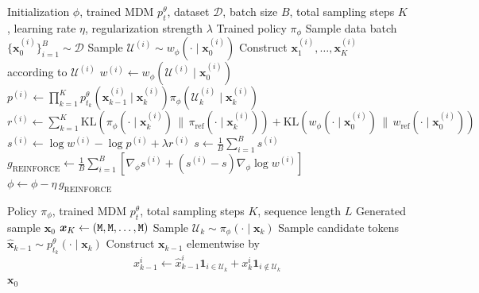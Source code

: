 \begin{algorithm}[tb]
  \caption{\alg{} Training}
  \label{alg:train}
  \begin{algorithmic}[1]
    \Input Initialization $\phi$, trained MDM $p^\theta_t$, dataset $\mathcal D$, batch size $B$, total sampling steps $K$, learning rate $\eta$, regularization strength $\lambda$
    \Output Trained policy $\pi_\phi$
    \Repeat
      \State Sample data batch $\{\bm x_0^{(i)}\}_{i=1}^B \sim \mathcal D$
        \State Sample $\mathcal U^{(i)} \sim w_\phi(\cdot \mid \bm x_0^{(i)})$
        \State Construct $\bm x_1^{(i)},\ldots,\bm x_K^{(i)}$ according to $\mathcal U^{(i)}$
        \State $w^{(i)} \gets w_\phi(\mathcal U^{(i)} \mid \bm x_0^{(i)})$
        \State $p^{(i)} \gets \prod_{k=1}^K
        p^\theta_{t_k}(\bm x_{k-1}^{(i)} \mid \bm x_k^{(i)})
        \pi_\phi(\mathcal U_{k}^{(i)} \mid \bm x_k^{(i)})$
        \State $r^{(i)} \gets
        \sum_{k=1}^K
        \mathrm{KL}\!\left(
        \pi_\phi(\cdot \mid \bm x_k^{(i)})
        \,\|\, 
        \pi_{\mathrm{ref}}(\cdot \mid \bm x_k^{(i)})
        \right)+
        \mathrm{KL}\!\left(
        w_\phi(\cdot \mid \bm x_0^{(i)})
        \,\|\,
        w_{\mathrm{ref}}(\cdot \mid \bm x_0^{(i)})
        \right)$
        \State $s^{(i)} \gets \log w^{(i)} - \log p^{(i)} + \lambda r^{(i)}$
      \EndFor
      \State $s \gets \frac{1}{B}\sum_{i=1}^B s^{(i)}$
      \State $g_{\text{REINFORCE}} \gets
      \frac{1}{B}\sum_{i=1}^B
      \left[
      \nabla_\phi s^{(i)}
      +
      \left(s^{(i)} - s\right)
      \nabla_\phi \log w^{(i)}
      \right]$
      \State $\phi \gets \phi - \eta\, g_{\text{REINFORCE}}$
  \end{algorithmic}
\end{algorithm}

\begin{algorithm}[tb]
  \caption{\alg{} Inference}
  \label{alg:inf}
  \begin{algorithmic}[1]
    \Input Policy $\pi_\phi$, trained MDM $p^\theta_t$, total sampling steps $K$, sequence length $L$
    \Output Generated sample $\bm x_0$
    \State $\bm x_K \gets (\texttt{M}{}, \texttt{M}{}, \ldots, \texttt{M}{})$
      \State Sample $\mathcal U_{k} \sim \pi_\phi(\cdot \mid \bm x_k)$
      \State Sample candidate tokens $\hat{\bm x}_{k-1} \sim p_{t_k}^\theta(\cdot \mid \bm x_k)$
      \State Construct $\bm x_{k-1}$ elementwise by
      \[
        x_{k-1}^i
        \gets
        \hat{x}_{k-1}^i \mathbf{1}_{i \in \mathcal U_k}
        +
        x_k^i \mathbf{1}_{i \notin \mathcal U_k}
      \]
    \EndFor
    \State \Return $\bm x_0$
  \end{algorithmic}
\end{algorithm}
